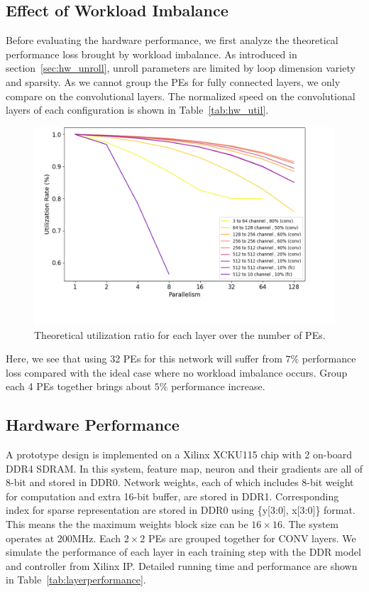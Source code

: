 

\subsection{Effect of Workload Imbalance}\label{sec:exp:imb}

Before evaluating the hardware performance, we first analyze the theoretical performance loss brought by workload imbalance. As introduced in section~\ref{sec:hw_unroll}, unroll parameters are limited by loop dimension variety and sparsity. As we cannot group the PEs for fully connected layers, we only compare on the convolutional layers. The normalized speed on the convolutional layers of each configuration is shown in Table~\ref{tab:hw_util}.



\begin{figure}[tb]
  \centering
  \includegraphics[width=1.0\columnwidth]{figures/util_real.png}
  \caption{Theoretical utilization ratio for each layer over the number of PEs.}
  \label{fig:util_real}
\end{figure}

Here, we see that using 32 PEs for this network will suffer from $7\%$ performance loss compared with the ideal case where no workload imbalance occurs. Group each 4 PEs together brings about $5\%$ performance increase. 


\subsection{Hardware Performance}
A prototype design is implemented on a Xilinx XCKU115 chip with 2 on-board DDR4 SDRAM. In this system, feature map, neuron and their gradients are all of 8-bit and stored in DDR0. Network weights, each of which includes 8-bit weight for computation and extra 16-bit buffer, are stored in DDR1. Corresponding index for sparse representation are stored in DDR0 using \{y[3:0], x[3:0]\} format. This means the the maximum weights block size can be $16\times 16$. The system operates at 200MHz. Each $2\times 2$ PEs are grouped together for CONV layers. We simulate the performance of each layer in each training step with the DDR model and controller from Xilinx IP. Detailed running time and performance are shown in Table~\ref{tab:layerperformance}.

